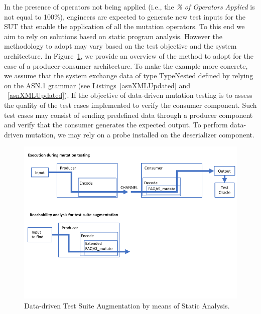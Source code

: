 In the presence of operators not being applied (i.e., the \emph{\% of Operators Applied} is not equal to 100\%), engineers are expected to generate new test inputs for the SUT that enable the application of all the mutation operators. 
To this end we aim to rely on solutions based on static program analysis. 
However the methodology to adopt may vary based on the test objective and the system architecture. In Figure~\ref{fig:dataDrivenTestSuiteAugmentation}, we provide an overview of the method to adopt for the case of a producer-consumer architecture. To make the example more concrete, we assume that the system exchange data of type TypeNested defined by relying on the ASN.1 grammar (see Listings~\ref{asnXMLUpdated} and ~\ref{asnXMLUpdated}). 
If the objective of data-driven mutation testing is to assess the quality of the test cases implemented to verify the consumer component. 
Such test cases may consist of sending predefined data through a producer component and verify that the consumer generates the expected output. 
To perform data-driven mutation, we may rely on a probe installed on the deserializer component. 

\begin{figure}[h]
  \centering
    \includegraphics[width=14cm]{images/dataDrivenTestSuiteAugmentation}
      \caption{Data-driven Test Suite Augmentation by means of Static Analysis.}
      \label{fig:dataDrivenTestSuiteAugmentation}
\end{figure}

